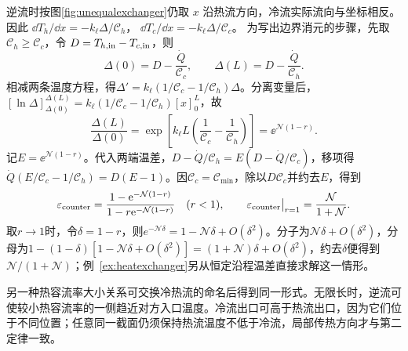逆流时按图\ref{fig:unequalexchanger}仍取 $x$ 沿热流方向，冷流实际流向与坐标相反。因此
$\dd T_h/\dd x=-k_\ell\Delta/\mathcal C_h$，
$\dd T_c/\dd x=-k_\ell\Delta/\mathcal C_c$。
为写出边界消元的步骤，先取 $\mathcal C_h\ge\mathcal C_c$，令
$D=T_{h,\rm in}-T_{c,\rm in}$，则
\[
 \Delta(0)=D-\frac{\dot Q}{\mathcal C_c},\qquad
 \Delta(L)=D-\frac{\dot Q}{\mathcal C_h}.
\]
相减两条温度方程，得$\Delta'=k_\ell(1/\mathcal C_c-1/\mathcal C_h)\Delta$。分离变量后，$[\ln\Delta]_{\Delta(0)}^{\Delta(L)}=k_\ell(1/\mathcal C_c-1/\mathcal C_h)[x]_0^L$，故
\[
 \frac{\Delta(L)}{\Delta(0)}
 =\exp\!\left[k_\ell L\left(
 \frac1{\mathcal C_c}-\frac1{\mathcal C_h}\right)\right]
 =\ee^{\mathcal N(1-r)}.
\]
记$E=\ee^{\mathcal N(1-r)}$。代入两端温差，$D-\dot Q/\mathcal C_h=E(D-\dot Q/\mathcal C_c)$，移项得$\dot Q(E/\mathcal C_c-1/\mathcal C_h)=D(E-1)$。因$\mathcal C_c=\mathcal C_{\min}$，除以$D\mathcal C_c$并约去$E$，得到
\[
 \varepsilon_{\rm counter}
 =\frac{1-\mathrm e^{-\mathcal N(1-r)}}
 {1-r\mathrm e^{-\mathcal N(1-r)}}\quad(r<1),\qquad
 \varepsilon_{\rm counter}\big|_{r=1}
 =\frac{\mathcal N}{1+\mathcal N}.
\]
取$r\to1$时，令$\delta=1-r$，则$e^{-\mathcal N\delta}=1-\mathcal N\delta+O(\delta^2)$。分子为$\mathcal N\delta+O(\delta^2)$，分母为$1-(1-\delta)[1-\mathcal N\delta+O(\delta^2)]=(1+\mathcal N)\delta+O(\delta^2)$，约去$\delta$便得到$\mathcal N/(1+\mathcal N)$；例~\ref{ex:heatexchanger}另从恒定沿程温差直接求解这一情形。

另一种热容流率大小关系可交换冷热流的命名后得到同一形式。无限长时，逆流可使较小热容流率的一侧趋近对方入口温度。冷流出口可高于热流出口，因为它们位于不同位置；任意同一截面仍须保持热流温度不低于冷流，局部传热方向才与第二定律一致。

